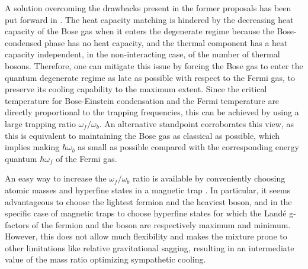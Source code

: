 \documentclass[pra,letterpaper,twocolumn,showpacs,superscriptaddress]{revtex4}
\begin{document}
A solution overcoming the drawbacks present in the former proposals has been put forward in \cite{Onofrio2002}. 
The heat capacity matching is hindered by the decreasing heat capacity of the Bose gas when it enters the degenerate 
regime because the Bose-condensed phase has no heat capacity, and the thermal component has a heat capacity independent, 
in the non-interacting case, of the number of thermal bosons. Therefore, one can mitigate this issue by forcing the 
Bose gas to enter the quantum degenerate regime as late as possible with respect to the Fermi gas, to preserve its cooling capability to the 
maximum extent. Since the critical temperature for Bose-Einstein condensation and the Fermi temperature 
are directly proportional to the trapping frequencies, this can be achieved by using a large trapping ratio $\omega_f/\omega_b$. 
An alternative standpoint corroborates this view, as this is equivalent to maintaining the Bose gas as classical as possible, which 
implies making $\hbar \omega_b$ as small as possible compared with the corresponding energy quantum $\hbar \omega_f$ of the Fermi gas. 

An easy way to increase the $\omega_f/\omega_b$ ratio is available by conveniently choosing atomic masses and hyperfine states 
in a magnetic trap \cite{Brown2004}. In particular, it seems advantageous to choose the lightest fermion and the heaviest boson, and 
in the specific case of magnetic traps to choose hyperfine states for which the Land\'e g-factors of the fermion and the boson are 
respectively maximum and minimum. However, this does not allow much flexibility and makes the mixture prone to other limitations 
like relative gravitational sagging, resulting in an intermediate value of the mass ratio optimizing sympathetic cooling. 
\end{document}
